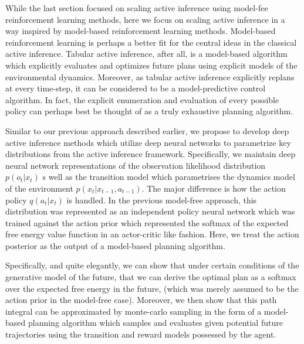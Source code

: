While the last section focused on scaling active inference using model-fee reinforcement learning methods, here we focus on scaling active inference in a way inspired by model-based reinforcement learning methods.
Model-based reinforcement learning is perhaps a better fit for the central ideas in the classical active inference. Tabular active inference, after all, is a model-based algorithm which explicitly evaluates and optimizes future plans using explicit models of the environmental dynamics. Moreover, as tabular active inference explicitly replans at every time-step, it can be considered to be a model-predictive control algorithm. In fact, the explicit enumeration and evaluation of every possible policy can perhaps best be thought of as a truly exhaustive planning algorithm.

Similar to our previous approach described earlier, we propose to develop deep active inference methods which utilize deep neural networks to parametrize key distributions from the active inference framework. Specifically, we maintain deep neural network representations of the observation likelihood distribution $p(o_t | x_t)$ s well as the transition model which parametrises the dynamics model of the environment $p(x_t | x_{t-1}, a_{t-1})$. The major difference is how the action policy $q(a_t | x_t)$ is handled. In the previous model-free approach, this distribution was represented as an independent policy neural network which was trained against the action prior which represented the softmax of the expected free energy value function in an actor-critic like fashion. Here, we treat the action posterior as the output of a model-based planning algorithm.

Specifically, and quite elegantly, we can show that under certain conditions of the generative model of the future, that we can derive the optimal plan as a softmax over the expected free energy in the future, (which was merely assumed to be the action prior in the model-free case). Moreover, we then show that this path integral can be approximated by monte-carlo sampling in the form of a model-based planning algorithm which samples and evaluates given potential future trajectories using the transition and reward models possessed by the agent.

